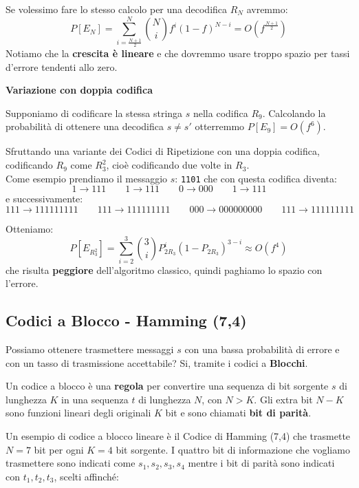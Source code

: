 Se volessimo fare lo stesso calcolo per una decodifica $R_N$ avremmo:
$$
P[E_N]=\sum^{N}_{i=\frac{N+1}{2}} \binom{N}{i}f^i(1-f)^{N-i} = O(f^{\frac{N+1}{2}})
$$
Notiamo che la \textbf{crescita è lineare} e che dovremmo usare troppo spazio per tassi d'errore tendenti allo zero.

\textbf{Variazione con doppia codifica}

Supponiamo di codificare la stessa stringa $s$ nella codifica $R_9$. Calcolando la probabilità di ottenere una decodifica $s\neq s'$ otterremmo $P[E_9]=O(f^6)$.

Sfruttando una variante dei Codici di Ripetizione con una doppia codifica, codificando $R_9$ come $R^2_3$, cioè codificando due volte in $R_3$.\\ 
Come esempio prendiamo il messaggio $s$: \verb|1101| che con questa codifica diventa:
$$
1 \rightarrow 111 \qquad 1 \rightarrow 111 \qquad 0 \rightarrow 000 \qquad 1 \rightarrow 111 \qquad
$$
e successivamente:
$$
111 \rightarrow 111111111 \qquad 111 \rightarrow 111111111 \qquad 000 \rightarrow 000000000 \qquad 111 \rightarrow 111111111 \qquad
$$

Otteniamo: 
$$
P[E_{R^2_3}]=\sum^{3}_{i=2}\binom{3}{i}P^i_{2R_3}(1-P_{2R_3})^{3-i} \approx O(f^4)
$$
che risulta \textbf{peggiore} dell'algoritmo classico, quindi paghiamo lo spazio con l'errore.


\subsection{Codici a Blocco - Hamming (7,4)}
Possiamo ottenere trasmettere messaggi $s$ con una bassa probabilità di errore e con un tasso di trasmissione accettabile? Si, tramite i codici a \textbf{Blocchi}.

Un codice a blocco è una \textbf{regola} per convertire una sequenza di bit sorgente $s$ di lunghezza $K$ in una sequenza $t$ di lunghezza $N$, con $N > K$. Gli extra bit $N-K$ sono funzioni lineari degli originali $K$ bit e sono chiamati \textbf{bit di parità}.

Un esempio di codice a blocco lineare è il Codice di Hamming (7,4) che trasmette $N=7$ bit per ogni $K=4$ bit sorgente.
I quattro bit di informazione che vogliamo trasmettere sono indicati come $s_1, s_2, s_3, s_4$ mentre i bit di parità sono indicati con $t_1, t_2, t_3$, scelti affinché:

